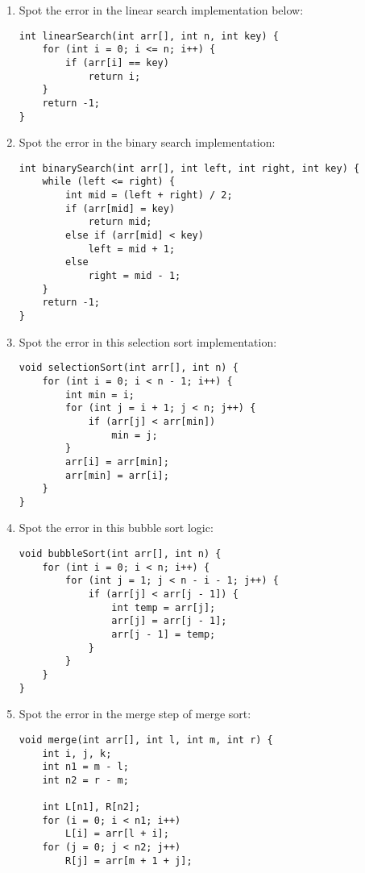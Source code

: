 \documentclass[a4paper,12pt]{article}
\begin{document}
\begin{enumerate}
    \item Spot the error in the linear search implementation below:
\begin{lstlisting}
int linearSearch(int arr[], int n, int key) {
    for (int i = 0; i <= n; i++) {
        if (arr[i] == key)
            return i;
    }
    return -1;
}
\end{lstlisting}

    \item Spot the error in the binary search implementation:
\begin{lstlisting}
int binarySearch(int arr[], int left, int right, int key) {
    while (left <= right) {
        int mid = (left + right) / 2;
        if (arr[mid] = key)
            return mid;
        else if (arr[mid] < key)
            left = mid + 1;
        else
            right = mid - 1;
    }
    return -1;
}
\end{lstlisting}

    \item Spot the error in this selection sort implementation:
\begin{lstlisting}
void selectionSort(int arr[], int n) {
    for (int i = 0; i < n - 1; i++) {
        int min = i;
        for (int j = i + 1; j < n; j++) {
            if (arr[j] < arr[min])
                min = j;
        }
        arr[i] = arr[min];
        arr[min] = arr[i];
    }
}
\end{lstlisting}

    \item Spot the error in this bubble sort logic:
\begin{lstlisting}
void bubbleSort(int arr[], int n) {
    for (int i = 0; i < n; i++) {
        for (int j = 1; j < n - i - 1; j++) {
            if (arr[j] < arr[j - 1]) {
                int temp = arr[j];
                arr[j] = arr[j - 1];
                arr[j - 1] = temp;
            }
        }
    }
}
\end{lstlisting}

\newpage

    \item Spot the error in the merge step of merge sort:
\begin{lstlisting}
void merge(int arr[], int l, int m, int r) {
    int i, j, k;
    int n1 = m - l;
    int n2 = r - m;

    int L[n1], R[n2];
    for (i = 0; i < n1; i++)
        L[i] = arr[l + i];
    for (j = 0; j < n2; j++)
        R[j] = arr[m + 1 + j];


\end{lstlisting}
\end{enumerate}
\end{document}

